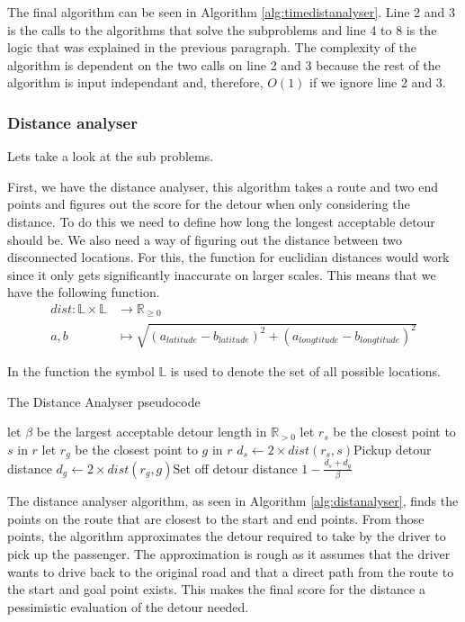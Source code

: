 The final algorithm can be seen in Algorithm \ref{alg:timedistanalyser}.
Line 2 and 3 is the calls to the algorithms that solve the subproblems and line 4 to 8 is the logic that was explained in the previous paragraph.
The complexity of the algorithm is dependent on the two calls on line 2 and 3 because the rest of the algorithm is input independant and, therefore, $O(1)$ if we ignore line 2 and 3.

\subsubsection{Distance analyser}

Lets take a look at the sub problems.

First, we have the distance analyser, this algorithm takes a route and two end points and figures out the score for the detour when only considering the distance.
To do this we need to define how long the longest acceptable detour should be.
We also need a way of figuring out the distance between two disconnected locations. 
For this, the function for euclidian distances would work since it only gets significantly inaccurate on larger scales.
This means that we have the following function.
\begin{align*}
	dist : \mathbb{L}\times\mathbb{L} &\rightarrow \mathbb{R}_{\geq 0}\\
	a, b &\mapsto \sqrt{(a_{latitude} - b_{latitude})^2 + (a_{longtitude} - b_{longtitude})^2}
\end{align*}

In the function the symbol $\mathbb{L}$ is used to denote the set of all possible locations.


\begin{algorithm}
	\caption{The Distance Analyser pseudocode}
	\label{alg:distanalyser}
	\begin{algorithmic}[1]
		\Require 
		\Statex let $\beta$ be the largest acceptable detour length in $\mathbb{R}_{>0}$ 
		\Statex 
			\State let $r_s$ be the closest point to $s$ in $r$
			\State let $r_g$ be the closest point to $g$ in $r$
			\State $d_s\gets 2\times dist(r_s, s)$\Comment Pickup detour distance
			\State $d_g\gets 2\times dist(r_g, g)$\Comment Set off detour distance
			\State\Return $1-\frac{d_s + d_g}{\beta}$
		\EndFunction
	\end{algorithmic}
\end{algorithm}

The distance analyser algorithm, as seen in Algorithm \ref{alg:distanalyser}, finds the points on the route that are closest to the start and end points.
From those points, the algorithm approximates the detour required to take by the driver to pick up the passenger.
The approximation is rough as it assumes that the driver wants to drive back to the original road and that a direct path from the route to the start and goal point exists.
This makes the final score for the distance a pessimistic evaluation  of the detour needed.


